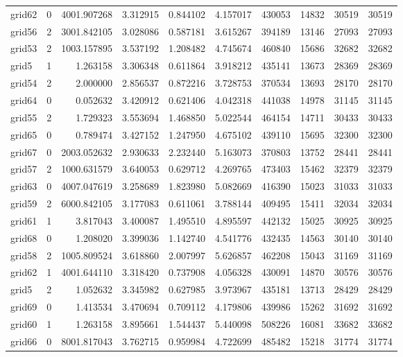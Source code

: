\begin{longtable}{|l|r|r|r|r|r|r|r|r|r|}
grid62 & 0 & 4001.907268 & 3.312915 & 0.844102 & 4.157017 & 430053 & 14832 & 30519 & 30519 \\
grid56 & 2 & 3001.842105 & 3.028086 & 0.587181 & 3.615267 & 394189 & 13146 & 27093 & 27093 \\
grid53 & 2 & 1003.157895 & 3.537192 & 1.208482 & 4.745674 & 460840 & 15686 & 32682 & 32682 \\
grid5 & 1 & 1.263158 & 3.306348 & 0.611864 & 3.918212 & 435141 & 13673 & 28369 & 28369 \\
grid54 & 2 & 2.000000 & 2.856537 & 0.872216 & 3.728753 & 370534 & 13693 & 28170 & 28170 \\
grid64 & 0 & 0.052632 & 3.420912 & 0.621406 & 4.042318 & 441038 & 14978 & 31145 & 31145 \\
grid55 & 2 & 1.729323 & 3.553694 & 1.468850 & 5.022544 & 464154 & 14711 & 30433 & 30433 \\
grid65 & 0 & 0.789474 & 3.427152 & 1.247950 & 4.675102 & 439110 & 15695 & 32300 & 32300 \\
grid67 & 0 & 2003.052632 & 2.930633 & 2.232440 & 5.163073 & 370803 & 13752 & 28441 & 28441 \\
grid57 & 2 & 1000.631579 & 3.640053 & 0.629712 & 4.269765 & 473403 & 15462 & 32379 & 32379 \\
grid63 & 0 & 4007.047619 & 3.258689 & 1.823980 & 5.082669 & 416390 & 15023 & 31033 & 31033 \\
grid59 & 2 & 6000.842105 & 3.177083 & 0.611061 & 3.788144 & 409495 & 15411 & 32034 & 32034 \\
grid61 & 1 & 3.817043 & 3.400087 & 1.495510 & 4.895597 & 442132 & 15025 & 30925 & 30925 \\
grid68 & 0 & 1.208020 & 3.399036 & 1.142740 & 4.541776 & 432435 & 14563 & 30140 & 30140 \\
grid58 & 2 & 1005.809524 & 3.618860 & 2.007997 & 5.626857 & 462208 & 15043 & 31169 & 31169 \\
grid62 & 1 & 4001.644110 & 3.318420 & 0.737908 & 4.056328 & 430091 & 14870 & 30576 & 30576 \\
grid5 & 2 & 1.052632 & 3.345982 & 0.627985 & 3.973967 & 435181 & 13713 & 28429 & 28429 \\
grid69 & 0 & 1.413534 & 3.470694 & 0.709112 & 4.179806 & 439986 & 15262 & 31692 & 31692 \\
grid60 & 1 & 1.263158 & 3.895661 & 1.544437 & 5.440098 & 508226 & 16081 & 33682 & 33682 \\
grid66 & 0 & 8001.817043 & 3.762715 & 0.959984 & 4.722699 & 485482 & 15218 & 31774 & 31774 \\

\end{longtable}
